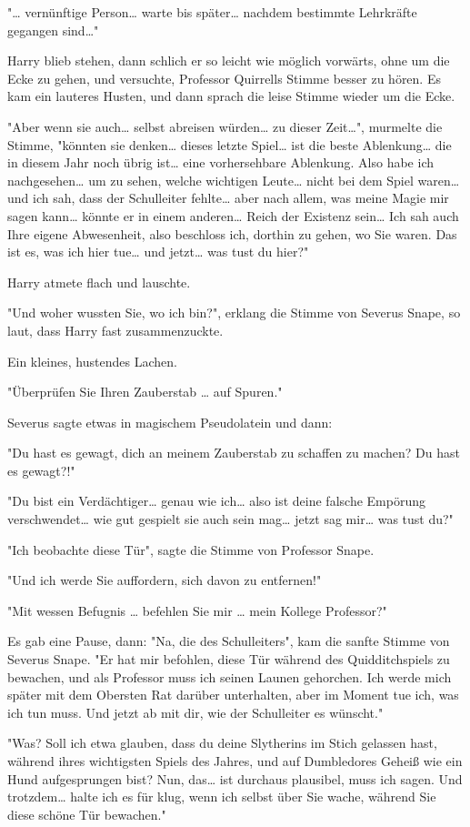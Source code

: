 {"… vernünftige Person… warte bis später… nachdem bestimmte Lehrkräfte gegangen sind…"

Harry blieb stehen, dann schlich er so leicht wie möglich vorwärts, ohne um die Ecke zu gehen, und versuchte, Professor Quirrells Stimme besser zu hören. Es kam ein lauteres Husten, und dann sprach die leise Stimme wieder um die Ecke.

"Aber wenn sie auch… selbst abreisen würden… zu dieser Zeit…", murmelte die Stimme, "könnten sie denken… dieses letzte Spiel… ist die beste Ablenkung… die in diesem Jahr noch übrig ist… eine vorhersehbare Ablenkung. Also habe ich nachgesehen… um zu sehen, welche wichtigen Leute… nicht bei dem Spiel waren… und ich sah, dass der Schulleiter fehlte… aber nach allem, was meine Magie mir sagen kann… könnte er in einem anderen… Reich der Existenz sein… Ich sah auch Ihre eigene Abwesenheit, also beschloss ich, dorthin zu gehen, wo Sie waren. Das ist es, was ich hier tue… und jetzt… was tust du hier?"

Harry atmete flach und lauschte.

"Und woher wussten Sie, wo ich bin?", erklang die Stimme von Severus Snape, so laut, dass Harry fast zusammenzuckte.

Ein kleines, hustendes Lachen.

"Überprüfen Sie Ihren Zauberstab … auf Spuren."

Severus sagte etwas in magischem Pseudolatein und dann:

"Du hast es gewagt, dich an meinem Zauberstab zu schaffen zu machen? Du hast es gewagt?!"

"Du bist ein Verdächtiger… genau wie ich… also ist deine falsche Empörung verschwendet… wie gut gespielt sie auch sein mag… jetzt sag mir… was tust du?"

"Ich beobachte diese Tür", sagte die Stimme von Professor Snape.

"Und ich werde Sie auffordern, sich davon zu entfernen!"

"Mit wessen Befugnis … befehlen Sie mir … mein Kollege Professor?"

Es gab eine Pause, dann: "Na, die des Schulleiters", kam die sanfte Stimme von Severus Snape. "Er hat mir befohlen, diese Tür während des Quidditchspiels zu bewachen, und als Professor muss ich seinen Launen gehorchen. Ich werde mich später mit dem Obersten Rat darüber unterhalten, aber im Moment tue ich, was ich tun muss. Und jetzt ab mit dir, wie der Schulleiter es wünscht."

"Was? Soll ich etwa glauben, dass du deine Slytherins im Stich gelassen hast, während ihres wichtigsten Spiels des Jahres, und auf Dumbledores Geheiß wie ein Hund aufgesprungen bist? Nun, das… ist durchaus plausibel, muss ich sagen. Und trotzdem… halte ich es für klug, wenn ich selbst über Sie wache, während Sie diese schöne Tür bewachen."

}
